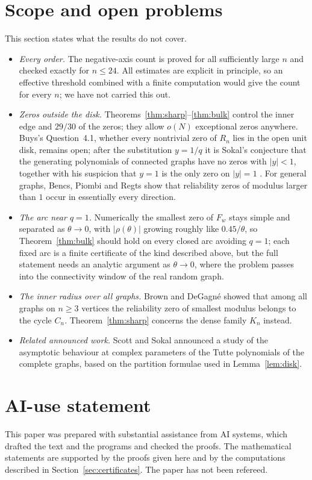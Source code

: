 \documentclass[11pt,a4paper]{article}
\theoremstyle{remark}
\begin{document}
\section{Scope and open problems}\label{sec:scope}
This section states what the results do not cover.
\begin{itemize}
\item \emph{Every order.} The negative-axis count is proved for all sufficiently large $n$ and checked exactly for $n\le24$. All estimates are explicit in principle, so an effective threshold combined with a finite computation would give the count for every $n$; we have not carried this out.
\item \emph{Zeros outside the disk.} Theorems~\ref{thm:sharp}--\ref{thm:bulk} control the inner edge and $29/30$ of the zeros; they allow $o(N)$ exceptional zeros anywhere. Buys's Question~4.1, whether every nontrivial zero of $R_n$ lies in the open unit disk, remains open; after the substitution $y=1/q$ it is Sokal's conjecture that the generating polynomials of connected graphs have no zeros with $|y|<1$, together with his suspicion that $y=1$ is the only zero on $|y|=1$ \cite[slide~8, Big Conjecture~\#3]{Sokal}. For general graphs, Bencs, Piombi and Regts \cite{BPR} show that reliability zeros of modulus larger than $1$ occur in essentially every direction.
\item \emph{The arc near $q=1$.} Numerically the smallest zero of $F_w$ stays simple and separated as $\theta\to0$, with $|\rho(\theta)|$ growing roughly like $0.45/\theta$, so Theorem~\ref{thm:bulk} should hold on every closed arc avoiding $q=1$; each fixed arc is a finite certificate of the kind described above, but the full statement needs an analytic argument as $\theta\to0$, where the problem passes into the connectivity window of the real random graph.
\item \emph{The inner radius over all graphs.} Brown and DeGagn\'e \cite{BD19b} showed that among all graphs on $n\ge3$ vertices the reliability zero of smallest modulus belongs to the cycle $C_n$. Theorem~\ref{thm:sharp} concerns the dense family $K_n$ instead.
\item \emph{Related announced work.} Scott and Sokal \cite[\S3.4.1 and ref.~55]{SS} announced a study of the asymptotic behaviour at complex parameters of the Tutte polynomials of the complete graphs, based on the partition formulae used in Lemma~\ref{lem:disk}.
\end{itemize}

\section*{AI-use statement}
This paper was prepared with substantial assistance from AI systems, which drafted the text and the programs and checked the proofs. The mathematical statements are supported by the proofs given here and by the computations described in Section~\ref{sec:certificates}. The paper has not been refereed.
\end{document}
